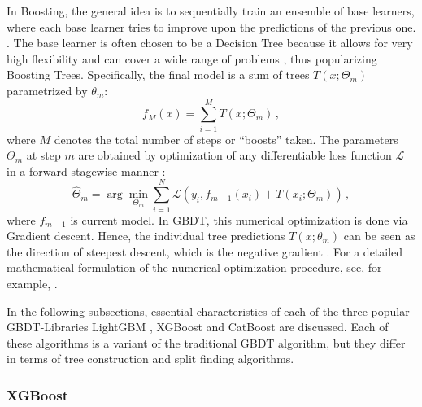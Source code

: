In Boosting, the general idea is to sequentially train an ensemble of base learners, where each base learner tries to improve upon the predictions of the previous one. \parencite[337]{hastie_elements_2009}. The base learner is often chosen to be a Decision Tree because it allows for very high flexibility and can cover a wide range of problems \parencite[350--352]{hastie_elements_2009}, thus popularizing Boosting Trees. Specifically, the final model is a sum of trees $T(x; \Theta_m)$ parametrized by $\theta_m$:
\begin{equation}
    f_M(x) = \sum_{i = 1}^M T(x; \Theta_m) \, ,
\end{equation}
where $M$ denotes the total number of steps or \enquote{boosts} taken. The parameters $\Theta_m$ at step $m$ are obtained by optimization of any differentiable loss function $\mathcal{L}$ in a forward stagewise manner \parencite[356--357]{hastie_elements_2009}:
\begin{equation}
    \label{eq:GBDT-optimization}
    \hat{\Theta}_m=\arg \min _{\Theta_m} \sum_{i=1}^N \mathcal{L}\left(y_i, f_{m-1}(x_i)+T(x_i ; \Theta_m)\right) \, ,
\end{equation}
where $f_{m-1}$ is current model.
In GBDT, this numerical optimization is done via Gradient descent. Hence, the individual tree predictions $T(x; \theta_m)$ can be seen as the direction of steepest descent, which is the negative gradient \parencite[359]{hastie_elements_2009}. For a detailed mathematical formulation of the numerical optimization procedure, see, for example, \cites[1189--1193]{friedman_greedy_2001}[353--360]{hastie_elements_2009}.

In the following subsections, essential characteristics of each of the three popular GBDT-Libraries LightGBM \parencite{ke_lightgbm_2017}, XGBoost \parencite{chen_xgboost_2016}  and CatBoost \parencite{prokhorenkova_catboost_2017} are discussed. Each of these algorithms is a variant of the traditional GBDT algorithm, but they differ in terms of tree construction and split finding algorithms.

\subsubsection{XGBoost}


